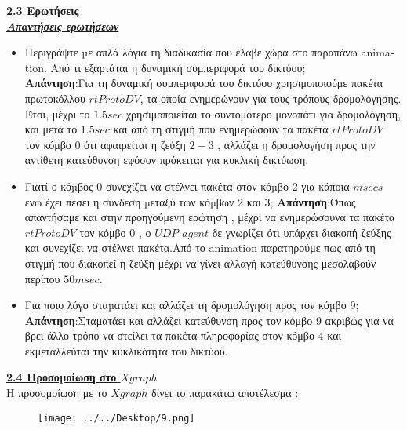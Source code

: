 \documentclass{article}%
\begin{document}
\textbf{{{2.3 Ερωτήσεις }}} \\
\textsl{\textbf{\underline{{Απαντήσεις ερωτήσεων}}}}\\
\begin{itemize}
	\item Περιγράψτε µε απλά λόγια τη διαδικασία που έλαβε χώρα στο παραπάνω \textlatin{animation}. Από τι
εξαρτάται η δυναμική συμπεριφορά του δικτύου;\\
\textbf{Απάντηση}:Για τη δυναμική συμπεριφορά του δικτύου χρησιμοποιούμε πακέτα πρωτοκόλλου $rtProtoDV$, τα οποία ενημερώνουν για τους τρόπους δρομολόγησης. Έτσι, μέχρι το $1.5sec$ χρησιμοποιείται το συντομότερο μονοπάτι για δρομολόγηση, και μετά το $1.5 sec$ και από τη στιγμή που ενημερώσουν τα πακέτα $rtProtoDV$ τον κόμβο 0 ότι αφαιρείται η ζεύξη $2-3$ , αλλάζει η δρομολογήση προς την αντίθετη κατεύθυνση εφόσον πρόκειται για κυκλική δικτύωση. \\
\item Γιατί ο κόµβος 0 συνεχίζει να στέλνει πακέτα στον κόµβο 2 για κάποια $msecs$ ενώ έχει πέσει η
σύνδεση µεταξύ των κόµβων 2 και 3;
\textbf{Απάντηση}:Όπως απαντήσαμε και στην προηγούμενη ερώτηση , μέχρι να ενημερώσουνα τα πακέτα $rtProtoDV$ τον κόμβο 0 , ο $UDP$ $agent$ δε γνωρίζει ότι υπάρχει διακοπή ζεύξης και συνεχίζει να στέλνει πακέτα.Από το \textlatin{animation} παρατηρούμε πως από τη στιγμή που διακοπεί η ζεύξη μέχρι να γίνει αλλαγή κατεύθυνσης μεσολαβούν περίπου $50msec$.\\
\item Για ποιο λόγο σταµατάει και αλλάζει τη δροµολόγηση προς τον κόµβο 9;
\textbf{Απάντηση}:Σταματάει και αλλάζει κατεύθυνση προς τον κόμβο 9 ακριβώς για να βρει άλλο τρόπο να στείλει τα πακέτα πληροφορίας στον κόμβο 4 και εκμεταλλεύται την κυκλικότητα του δικτύου.\\

\end{itemize}


\textbf{{\underline{2.4 Προσοµοίωση στο $Xgraph$ }}} \\
Η προσομοίωση με το $Xgraph$ δίνει το παρακάτω αποτέλεσμα :
\begin{figure}[htbp]
	\centering
		\texttt{[image: ../../Desktop/9.png]}
	\label{fig:9}
\end{figure}

\newpage
\end{document}
